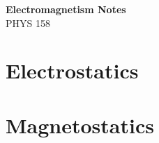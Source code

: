 \documentclass[12pt]{book}
\begin{document}
\begin{titlepage}
	\begin{center}
		\vspace*{1cm}

		\Huge
		\textbf{Electromagnetism Notes}\\
		\vspace{0.5cm}
		\LARGE
		PHYS 158
	\end{center}
\end{titlepage}
\tableofcontents
\part{Electrostatics}\label{pt:es}

\part{Magnetostatics}\label{pt:ms}

\end{document}
